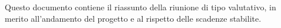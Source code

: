 Questo documento contiene il riassunto della riunione di tipo valutativo, in merito all'andamento del progetto e al rispetto delle scadenze stabilite.
